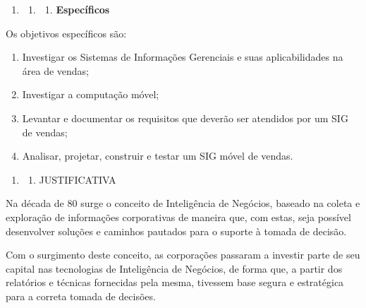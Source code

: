 \documentclass[a4paper]{article}
\newcounter{saveenum}
\newcommand\liststyleWWviiiNumi{%
\renewcommand\theenumi{\arabic{enumi}}
\renewcommand\theenumii{\arabic{enumi}.\arabic{enumii}}
\renewcommand\theenumiii{\arabic{enumi}.\arabic{enumii}.\arabic{enumiii}}
\renewcommand\theenumiv{\arabic{enumi}.\arabic{enumii}.\arabic{enumiii}.\arabic{enumiv}}
\renewcommand\labelenumi{\theenumi}
\renewcommand\labelenumii{\theenumii}
\renewcommand\labelenumiii{\theenumiii}
\renewcommand\labelenumiv{\theenumiv.}
}
\newcommand\liststyleWWviiiNumxxvii{%
\renewcommand\theenumi{\alph{enumi}}
\renewcommand\theenumii{\alph{enumii}}
\renewcommand\theenumiii{\roman{enumiii}}
\renewcommand\theenumiv{\arabic{enumiv}}
\renewcommand\labelenumi{\theenumi)}
\renewcommand\labelenumii{\theenumii.}
\renewcommand\labelenumiii{\theenumiii.}
\renewcommand\labelenumiv{\theenumiv.}
}
\begin{document}
\bigskip

\liststyleWWviiiNumi
\setcounter{saveenum}{\value{enumi}}
\begin{enumerate}
\setcounter{enumi}{\value{saveenum}}
\item \setcounter{saveenum}{\value{enumii}}
\begin{enumerate}
\setcounter{enumii}{\value{saveenum}}
\item \setcounter{saveenum}{\value{enumiii}}
\begin{enumerate}
\setcounter{enumiii}{\value{saveenum}}
\item {\sffamily\bfseries
Espec\'ificos}
\end{enumerate}
\end{enumerate}
\end{enumerate}
{\sffamily
Os objetivos espec\'ificos s\~ao:}

\liststyleWWviiiNumxxvii
\begin{enumerate}
\item {\sffamily
Investigar os Sistemas de Informa\c{c}\~oes Gerenciais e suas aplicabilidades na \'area de vendas;}
\item {\sffamily
Investigar a computa\c{c}\~ao m\'ovel;}
\item {\sffamily
Levantar e documentar os requisitos que dever\~ao ser atendidos por um SIG de vendas;}
\item {
\textsf{Analisar, projetar, construir e testar um SIG m\'ovel de vendas.}}
\end{enumerate}

\bigskip

\liststyleWWviiiNumi
\begin{enumerate}
\item \begin{enumerate}
\item {\sffamily
JUSTIFICATIVA}
\end{enumerate}
\end{enumerate}
{\sffamily
Na d\'ecada de 80 surge o conceito de Intelig\^encia de Neg\'ocios, baseado na coleta e explora\c{c}\~ao de
informa\c{c}\~oes corporativas de maneira que, com estas, seja poss\'ivel desenvolver solu\c{c}\~oes e caminhos
pautados para o suporte \`a tomada de decis\~ao.}

{\sffamily
Com o surgimento deste conceito, as corpora\c{c}\~oes passaram a investir parte de seu capital nas tecnologias de
Intelig\^encia de Neg\'ocios, de forma que, a partir dos relat\'orios e t\'ecnicas fornecidas pela mesma, tivessem base
segura e estrat\'egica para a correta tomada de decis\~oes.}
\end{document}
